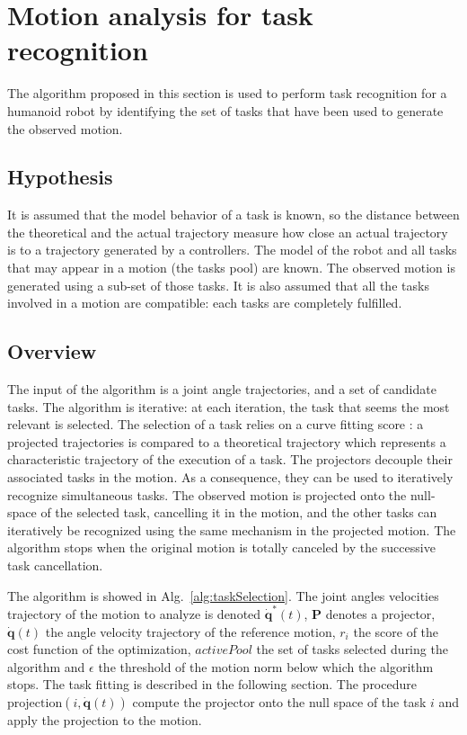\documentclass[letterpaper, 10pt, conference]{ieeeconf}      %
\begin{document}
\section{Motion analysis for task recognition} 
\label{sec:detect}
\label{section:algorithm}
The algorithm proposed in this section
is used to perform task recognition for a humanoid robot by
identifying the set of tasks that have been used to
generate the observed motion.

\subsection{Hypothesis}
It is assumed that the model behavior of a task is known, so the distance between
the theoretical and the actual trajectory measure how close an actual trajectory is
to a trajectory generated by a controllers.
The model of the robot and all tasks that may appear in a motion (the tasks pool) are known.
The observed motion is generated using a sub-set of those tasks.  
It is also assumed that all the tasks involved in a motion are compatible:
each tasks are completely fulfilled. 

\subsection{Overview}
\label{sec:alg1:selec}
The input of the algorithm is a joint angle trajectories, and a set of candidate
tasks. The algorithm is iterative: at each iteration, the task that seems the
most relevant is selected. The selection of a task relies
on a curve fitting score : a projected trajectories is 
compared to a theoretical trajectory which represents a characteristic
trajectory of the execution of a task.
The projectors decouple their associated tasks in the motion.
As a consequence, they can be used to iteratively recognize
simultaneous tasks. The observed motion is projected
onto the null-space of the selected task, cancelling it in the motion,
and the other tasks can iteratively be recognized using the same mechanism in the projected motion.
The algorithm stops when the original
motion is totally canceled by the successive task cancellation.

The algorithm is showed in Alg.~\ref{alg:taskSelection}.
The joint angles velocities trajectory
of the motion to analyze is denoted $\mathbf{\dot{q}}^{*}(t)$,
$\mathbf{P}$ denotes a projector, $\mathbf{\dot{q}}(t)$ the angle velocity trajectory
of the reference motion, $r_i$ the score of the cost function of the optimization, $activePool$
the set of tasks selected during the algorithm and $\epsilon$ the threshold
of the motion norm below which the algorithm stops. The task fitting is described
in the following section. The procedure $\mathrm{projection}(i, \mathbf{\dot{q}}(t))$ compute the projector onto
the null space of the task $i$ and apply the projection to the motion.
\end{document}
